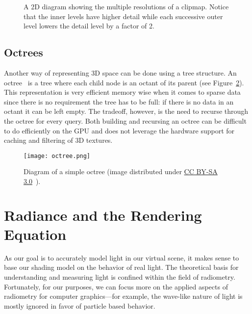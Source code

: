 
\begin{figure}[h]
\centering
\caption{A 2D diagram showing the multiple resolutions of a clipmap. Notice that the inner levels have higher detail while each successive outer level lowers the detail level by a factor of 2.}
\label{fig:geometryclipmaps}
\end{figure}

\subsection{Octrees}
Another way of representing 3D space can be done using a tree structure. An octree~\cite{MEAGHER1982129} is a tree where each child node is an octant of its parent (see Figure~\ref{fig:octree}). This representation is very efficient memory wise when it comes to sparse data since there is no requirement the tree has to be full: if there is no data in an octant it can be left empty. The tradeoff, however, is the need to recurse through the octree for every query. Both building and recursing an octree can be difficult to do efficiently on the GPU and does not leverage the hardware support for caching and filtering of 3D textures.

\begin{figure}[h]
\centering
\texttt{[image: octree.png]}
\caption{Diagram of a simple octree (image distributed under \href{https://creativecommons.org/licenses/by-sa/3.0/deed.en}{CC BY-SA 3.0}~\cite{octree}).}
\label{fig:octree}
\end{figure}

\section{Radiance and the Rendering Equation}
As our goal is to accurately model light in our virtual scene, it makes sense to base our shading model on the behavior of real light. The theoretical basis for understanding and measuring light is confined within the field of radiometry. Fortunately, for our purposes, we can focus more on the applied aspects of radiometry for computer graphics---for example, the wave-like nature of light is mostly ignored in favor of particle based behavior.

